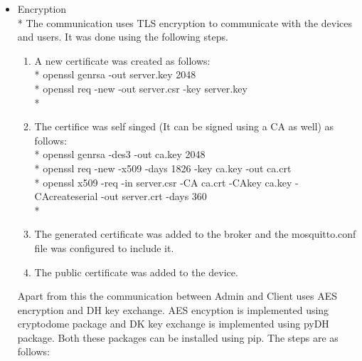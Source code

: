 \documentclass{report}
\begin{document}
\begin{itemize}
    \item Encryption\\* The communication uses TLS encryption to communicate with the devices and users. It was done using the following steps.
    \begin{enumerate}
        \item A new certificate was created as follows:\\*
        \hspace*{1cm}openssl genrsa -out server.key 2048\\*
        \hspace*{1cm}openssl req -new -out server.csr -key server.key\\*
        \item The certifice was self singed (It can be signed using a CA as well) as follows:\\*
        \hspace*{1cm}openssl genrsa -des3 -out ca.key 2048\\*
        \hspace*{1cm}openssl req -new -x509 -days 1826 -key ca.key -out ca.crt\\*
        \hspace*{1cm}openssl x509 -req -in server.csr -CA ca.crt -CAkey ca.key -CAcreateserial -out server.crt -days 360\\*
        
        \item The generated certificate was added to the broker and the mosquitto.conf file was configured to include it.
        
        \item The public certificate was added to the device.

    \end{enumerate}
    
    Apart from this the communication between Admin and Client uses AES encryption and DH key exchange. AES encyption is implemented using cryptodome package and DK key exchange is implemented using pyDH package. Both these packages can be installed using pip. The steps are as follows:


\end{itemize}
\end{document}
